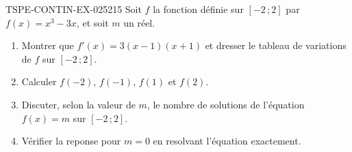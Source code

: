 \begin{exercice}{TSPE-CONTIN-EX-025}{2}{15}
Soit $f$ la fonction définie sur $[-2\,;2]$ par $f(x) = x^3 - 3x$, et soit $m$ un réel.
\begin{enumerate}
  \item Montrer que $f'(x) = 3(x-1)(x+1)$ et dresser le tableau de variations de $f$ sur $[-2\,;2]$.
  \item Calculer $f(-2)$, $f(-1)$, $f(1)$ et $f(2)$.
  \item Discuter, selon la valeur de $m$, le nombre de solutions de l'équation $f(x) = m$ sur $[-2\,;2]$.
  \item Vérifier la reponse pour $m = 0$ en resolvant l'équation exactement.
\end{enumerate}
\end{exercice}
